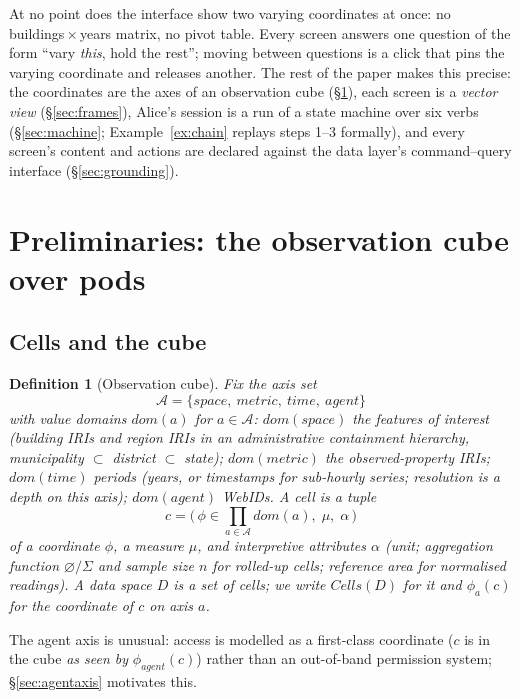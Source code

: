 \documentclass[11pt,a4paper]{article}
\newtheorem{definition}{Definition}[section]
\theoremstyle{remark}
\newcommand{\Ax}{\mathcal{A}}                    %
\newcommand{\Cells}{\mathit{Cells}}
\newcommand{\Dom}{\mathit{dom}}
\begin{document}
At no point does the interface show two varying coordinates at once: no
buildings\,$\times$\,years matrix, no pivot table. Every screen answers one
question of the form ``vary \emph{this}, hold the rest''; moving between
questions is a click that pins the varying coordinate and releases another. The
rest of the paper makes this precise: the coordinates are the axes of an
observation cube (\S\ref{sec:prelim}), each screen is a \emph{vector view}
(\S\ref{sec:frames}), Alice's session is a run of a state machine over six verbs
(\S\ref{sec:machine}; Example~\ref{ex:chain} replays steps 1--3 formally), and
every screen's content and actions are declared against the data layer's
command--query interface (\S\ref{sec:grounding}).

\section{Preliminaries: the observation cube over pods}\label{sec:prelim}

\subsection{Cells and the cube}

\begin{definition}[Observation cube]\label{def:cube}
Fix the axis set
\[
\Ax = \{\mathit{space},\ \mathit{metric},\ \mathit{time},\ \mathit{agent}\}
\]
with value domains $\Dom(a)$ for $a \in \Ax$:
$\Dom(\mathit{space})$ the features of interest (building IRIs and region IRIs in an
administrative containment hierarchy, municipality $\subset$ district $\subset$
state); $\Dom(\mathit{metric})$ the observed-property IRIs; $\Dom(\mathit{time})$
periods (years, or timestamps for sub-hourly series; resolution is a depth on this
axis); $\Dom(\mathit{agent})$ WebIDs. A \emph{cell} is a tuple
\[
c = \bigl(\,\phi \in \prod_{a\in\Ax}\Dom(a),\; \mu,\; \alpha\,\bigr)
\]
of a coordinate $\phi$, a measure $\mu$, and interpretive attributes $\alpha$ (unit;
aggregation function $\varnothing/\Sigma$ and sample size $n$ for rolled-up cells;
reference area for normalised readings). A \emph{data space} $D$ is a set of cells;
we write $\Cells(D)$ for it and $\phi_a(c)$ for the coordinate of $c$ on axis $a$.
\end{definition}

The agent axis is unusual: access is modelled as a first-class coordinate
($c$ is in the cube \emph{as seen by} $\phi_{\mathit{agent}}(c)$) rather than an
out-of-band permission system; \S\ref{sec:agentaxis} motivates this.
\end{document}

